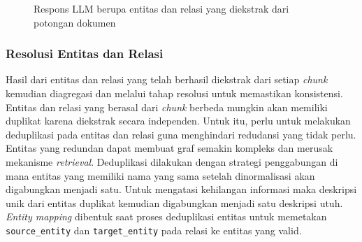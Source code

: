 \begin{figure}[H]
	\centering
	\caption{
		Respons LLM berupa entitas dan relasi yang diekstrak dari potongan dokumen
	}
	\label{fig:entity-relation-response}
\end{figure}

\subsubsection{Resolusi Entitas dan Relasi}

Hasil dari entitas dan relasi yang telah berhasil diekstrak dari setiap \textit{chunk} kemudian diagregasi dan melalui tahap resolusi untuk memastikan konsistensi.
Entitas dan relasi yang berasal dari \textit{chunk} berbeda mungkin akan memiliki duplikat karena diekstrak secara independen.
Untuk itu, perlu untuk melakukan deduplikasi pada entitas dan relasi guna menghindari redudansi yang tidak perlu.
Entitas yang redundan dapat membuat graf semakin kompleks dan merusak mekanisme \textit{retrieval}.
Deduplikasi dilakukan dengan strategi penggabungan di mana entitas yang memiliki nama yang sama setelah dinormalisasi akan digabungkan menjadi satu.
Untuk mengatasi kehilangan informasi maka deskripsi unik dari entitas duplikat kemudian digabungkan menjadi satu deskripsi utuh.
\textit{Entity mapping} dibentuk saat proses deduplikasi entitas untuk memetakan \texttt{source\_entity} dan \texttt{target\_entity} pada relasi ke entitas yang valid.

